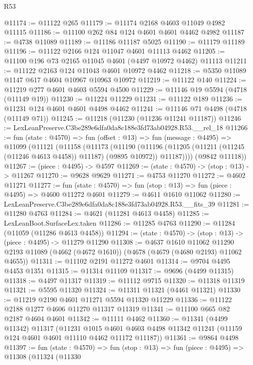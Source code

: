 \begin{lexlean}{R53}
\begin{coremodule}
@11174 := @11122 @265
@11179 := @11174 @2168 @4603 @11049 @4982 @11115
@11186 := @11100 @262 @84 @124 @4601 @4601 @4462 @4982
@11187 := @4738 @11089
@11189 := @11186 @11187 @5025
@11190 := @11179 @11189
@11196 := @11122 @2166 @124 @11047 @4601 @11113 @4462
@11205 := @11100 @196 @73 @2165 @11045 @4601 (@4497 @10972 @4462) @11113
@11211 := @11122 @2163 @124 @11043 @4601 @10972 @4462
@11218 := @5350 @11089 @1147 @617 @4604 @10967 @10963 @10972
@11219 := @11122 @140
@11224 := @11219 @277 @4601 @4603 @5594 @4500
@11229 := @11146 @19 @5594 (@4718 (@11149 @19))
@11230 := @11224 @11229
@11231 := @11122 @189
@11236 := @11231 @124 @4601 @4601 @4498 @4462
@11241 := @11146 @71 @4498 (@4718 (@11149 @71))
@11245 := @11218 (@11230 (@11236 @11241 @11187))
@11246 := LexLeanPreserve.C3be289e6dfa0da8c188e3fd73ab04928.R53.__rel_18
@11266 := fun (state : @4570) =>
  fun (offset : @13) =>
  fun (message : @4495) =>
  @11099
    (@11121
      (@11158
        (@11173
          (@11190
            (@11196 (@11205 (@11211 (@11245 (@11246 @4613 @4458)) @11187) (@9895 @10972)) @11187))))
      (@9842 @11118))
@11267 := (piece : @4495) -> @4597
@11269 := (state : @4570) -> (stop : @13) -> @11267
@11270 := @9628 @9629
@11271 := @4753 @11270
@11272 := @4602 @11271
@11277 := fun (state : @4570) => fun (stop : @13) => fun (piece : @4495) => @4600 @11272 @4601
@11279 := @4611 @1610 @11062
@11280 := LexLeanPreserve.C3be289e6dfa0da8c188e3fd73ab04928.R53.__fits_39
@11281 := @11280 @4763
@11284 := @4621 (@11281 @4613 @4458)
@11285 := LexLeanBoot.SurfaceLex.taken
@11286 := @11285 @4763
@11290 := @11284 (@11059 (@11286 @4613 @4458))
@11294 := (state : @4570) -> (stop : @13) -> (piece : @4495) -> @11279 @11290
@11308 := @4637
    @1610
    @11062
    @11290
    @2193
    @11089
    (@4662 (@4672 @1610))
    (@4678 (@4679 (@4680 @2193) @11062 @4655))
@11311 := @11102 @2191 @11272 @4601
@11314 := @9704 @4495 @4453 @1351
@11315 := @11314 @11109
@11317 := @9696 (@4499 @11315)
@11318 := @4497 @11317
@11319 := @11112 @9715
@11320 := @11318 @11319
@11321 := @5595 @11320
@11324 := @11311 @11321 (@4461 @11321)
@11330 := @11219 @2190 @4601 @11271 @5594 @11320 @11229
@11336 := @11122 @2188 @1277 @4606 @11270 @11317 @11319
@11341 := @11100 @665 @82 @2187 @4604 @4601
@11342 := @11111 @4462
@11360 := @11341
    (@4499 @11342)
    @11317
    (@11231
      @1015
      @4601
      @4603
      @4498
      @11342
      @11241
      (@11159 @124 @4601 @4601 @11110 @4462 @11172 @11187))
@11361 := @9864 @4498
@11397 := fun (state : @4570) =>
  fun (stop : @13) =>
  fun (piece : @4495) =>
  @11308
    (@11324
      (@11330

\end{coremodule}
\end{lexlean}
